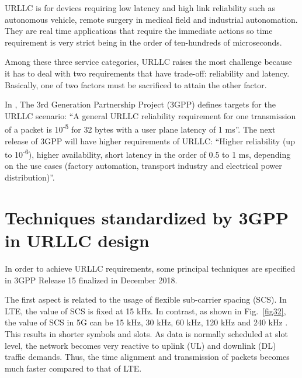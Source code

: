\documentclass{report}
\begin{document}
URLLC is for devices requiring low latency and high link reliability such as autonomous vehicle, remote surgery in medical field and industrial autonomation. They are real time applications that require the immediate actions so time requirement is very strict being in the order of ten-hundreds of microseconds. 

Among these three service categories, URLLC raises the most challenge because it has to deal with two requirements that have trade-off: reliability and latency. Basically, one of two factors must be sacrificed to attain the other factor. 

In \cite{ad1}, The 3rd Generation Partnership Project (3GPP) defines targets for the URLLC scenario: ``A general URLLC reliability requirement for one transmission of a packet is 10\textsuperscript{-5} for 32 bytes with a user plane latency of 1 ms''. The next release of 3GPP will have higher requirements of URLLC: ``Higher reliability (up to 10\textsuperscript{-6}), higher availability, short latency in the order of 0.5 to 1 ms, depending on the use cases (factory automation, transport industry and electrical power distribution)''\cite{ad2}.

\section{Techniques standardized by 3GPP in URLLC design}

In order to achieve URLLC requirements, some principal techniques are specified in 3GPP Release 15 finalized in December 2018.

The first aspect is related to the usage of flexible sub-carrier spacing (SCS). In LTE, the value of SCS is fixed at 15 kHz. In contrast, as shown in Fig.~\ref{fig32},  the value of SCS in 5G can be 15 kHz, 30 kHz, 60 kHz, 120 kHz and 240 kHz \cite{ad6}. This results in shorter symbols and slots. As data is normally scheduled at slot level, the network becomes very reactive to uplink (UL) and downlink (DL) traffic demands. Thus, the time alignment and transmission of packets becomes much faster compared to that of LTE.
\end{document}
